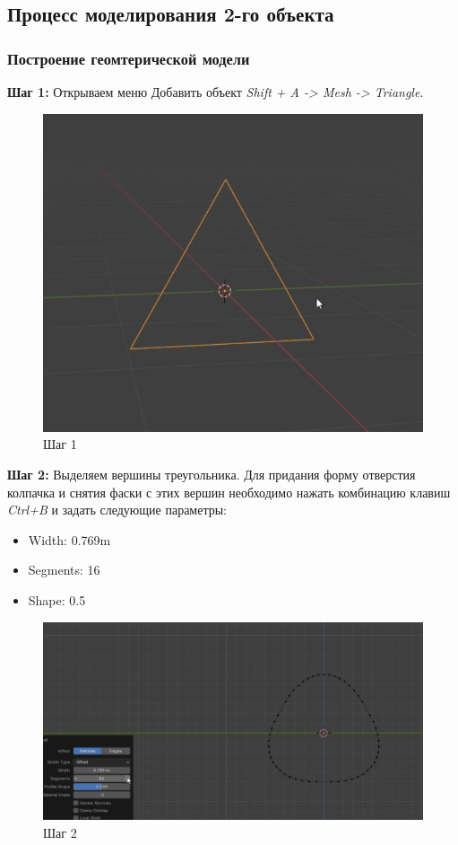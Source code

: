 \documentclass[areasetadvanced]{scrartcl}
\begin{document}
\newpage
\subsection{Процесс моделирования 2-го объекта}

\subsubsection{Построение геомтерической модели}
\par \textbf{Шаг 1:} Открываем меню Добавить объект \textit{Shift + A -> Mesh ->  Triangle}.
\begin{figure}[H]
    \label{4} 
    \centering
    \includegraphics[width=0.6\linewidth]{col/1.png}
    \caption{Шаг 1}
\end{figure}


\par \textbf{Шаг 2:} Выделяем вершины треугольника. Для придания форму отверстия колпачка и снятия фаски с этих вершин необходимо нажать комбинацию клавиш \textit{Ctrl+B} и задать следующие параметры:
\begin{itemize}
    \item Width: 0.769m
    \item Segments: 16
    \item Shape: 0.5
\end{itemize}

\begin{figure}[H]
    \label{4} 
    \centering
    \includegraphics[width=0.6\linewidth]{col/2.png}
    \caption{Шаг 2}
\end{figure} 
\end{document}
